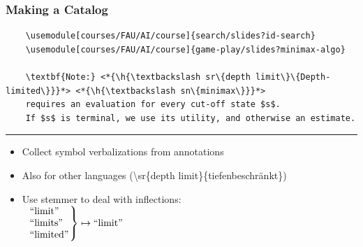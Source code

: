 \documentclass[aspectratio=169]{beamer}
\begin{document}
\begin{frame}[fragile]
    \frametitle{Making a Catalog}
    \def\h#1{\colorbox{yellow!50!red!70}{#1}}
    \begin{lstlisting}
    \usemodule[courses/FAU/AI/course]{search/slides?id-search}
    \usemodule[courses/FAU/AI/course]{game-play/slides?minimax-algo}

    \textbf{Note:} <*{\h{\textbackslash sr\{depth limit\}\{Depth-limited\}}}*> <*{\h{\textbackslash sn\{minimax\}}}*>
    requires an evaluation for every cut-off state $s$.
    If $s$ is terminal, we use its utility, and otherwise an estimate.
    \end{lstlisting}

    \noindent\rule{\textwidth}{0.8pt}
    \begin{itemize}
        \item Collect symbol verbalizations from annotations
        \item Also for other languages (\textbackslash sr\{depth limit\}\{tiefenbeschr\"ankt\})
        \item Use stemmer to deal with inflections:\\[0.5em]
            $
                    \left.
                \text{\begin{tabular}l ``limit'' \\ ``limits'' \\ ``limited''\end{tabular}}\!\!\!
                    \right\} \mapsto \text{``limit''}$
    \end{itemize}
    
\end{frame}
\end{document}
